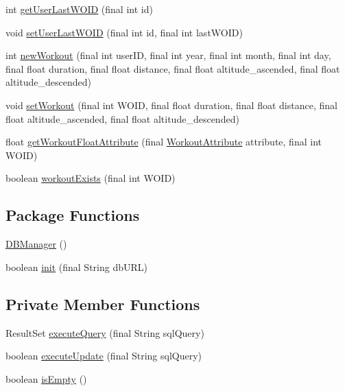 \begin{DoxyCompactItemize}
\item 
int \mbox{\hyperlink{classcom_1_1activitytracker_1_1_d_b_manager_a9a3f626218a0b97e26c21388c3780e81}{get\+User\+Last\+W\+O\+ID}} (final int id)
\item 
void \mbox{\hyperlink{classcom_1_1activitytracker_1_1_d_b_manager_a020ca55295a116649c33894cc94da893}{set\+User\+Last\+W\+O\+ID}} (final int id, final int last\+W\+O\+ID)
\item 
int \mbox{\hyperlink{classcom_1_1activitytracker_1_1_d_b_manager_a54aafd30a4e9f62cbfd0d3c61a887405}{new\+Workout}} (final int user\+ID, final int year, final int month, final int day, final float duration, final float distance, final float altitude\+\_\+ascended, final float altitude\+\_\+descended)
\item 
void \mbox{\hyperlink{classcom_1_1activitytracker_1_1_d_b_manager_a61b9a3229c76f9d07cc5b092d90b7ff5}{set\+Workout}} (final int W\+O\+ID, final float duration, final float distance, final float altitude\+\_\+ascended, final float altitude\+\_\+descended)
\item 
float \mbox{\hyperlink{classcom_1_1activitytracker_1_1_d_b_manager_a6bda377e79678d0e898c4240d24eb391}{get\+Workout\+Float\+Attribute}} (final \mbox{\hyperlink{enumcom_1_1activitytracker_1_1_workout_attribute}{Workout\+Attribute}} attribute, final int W\+O\+ID)
\item 
boolean \mbox{\hyperlink{classcom_1_1activitytracker_1_1_d_b_manager_a1ddc4af4997ccf31c023658fa7face2d}{workout\+Exists}} (final int W\+O\+ID)
\end{DoxyCompactItemize}
\subsection*{Package Functions}
\begin{DoxyCompactItemize}
\item 
\mbox{\hyperlink{classcom_1_1activitytracker_1_1_d_b_manager_ac1f558ef56fe02d74fe103a473a15bb5}{D\+B\+Manager}} ()
\item 
boolean \mbox{\hyperlink{classcom_1_1activitytracker_1_1_d_b_manager_a41df4600bb5901a26a4ea6a7108a70b9}{init}} (final String db\+U\+RL)
\end{DoxyCompactItemize}
\subsection*{Private Member Functions}
\begin{DoxyCompactItemize}
\item 
Result\+Set \mbox{\hyperlink{classcom_1_1activitytracker_1_1_d_b_manager_adef71a18dc05536d80e83311841e1953}{execute\+Query}} (final String sql\+Query)
\item 
boolean \mbox{\hyperlink{classcom_1_1activitytracker_1_1_d_b_manager_a382397e2bdf309901d1c80ff66be69b7}{execute\+Update}} (final String sql\+Query)
\item 
boolean \mbox{\hyperlink{classcom_1_1activitytracker_1_1_d_b_manager_af9ab112f840e3c803b6b28a2f1a15215}{is\+Empty}} ()
\end{DoxyCompactItemize}
